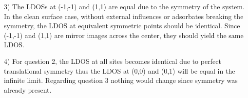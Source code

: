 3) The LDOSs at (-1,-1) and (1,1) are equal due to the symmetry of the system. In the clean surface case, without external influences or adsorbates breaking the symmetry, the LDOS at equivalent symmetric points should be identical. Since (-1,-1) and (1,1) are mirror images across the center, they should yield the same LDOS.

4) For question 2, the LDOS at all sites becomes identical due to perfect translational symmetry thus the LDOS at (0,0) and (0,1) will be equal in the infinite limit. Regarding question 3 nothing would change since symmetry was already present. 

